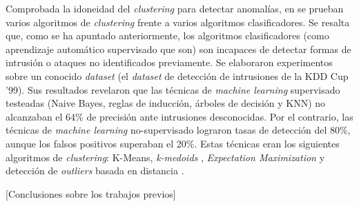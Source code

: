 Comprobada la idoneidad del \emph{clustering} para detectar anomalías, en \cite{Syarif_2012} se prueban varios algoritmos de \emph{clustering} frente a varios algoritmos clasificadores.
Se resalta que, como se ha apuntado anteriormente, los algoritmos clasificadores (como aprendizaje automático supervisado que son) son incapaces de detectar formas de intrusión o ataques no identificados previamente.
Se elaboraron experimentos sobre un conocido \emph{dataset} (el \emph{dataset} de detección de intrusiones de la KDD Cup '99).
Sus resultados revelaron que las técnicas de \emph{machine learning} supervisado testeadas (Naive Bayes, reglas de inducción, árboles de decisión y KNN) no alcanzaban el 64\% de precisión ante intrusiones desconocidas.
Por el contrario, las técnicas de \emph{machine learning} no-supervisado lograron tasas de detección del 80\%, aunque los falsos positivos superaban el 20\%.
Estas técnicas eran los siguientes algoritmos de \emph{clustering}: K-Means, \emph{k-medoids} \cite{Velmurugan_2010}, \emph{Expectation Maximization} \cite{Lu_2009} y detección de \emph{outliers} basada en distancia \cite{Orair_2010}.

[Conclusiones sobre los trabajos previos]
